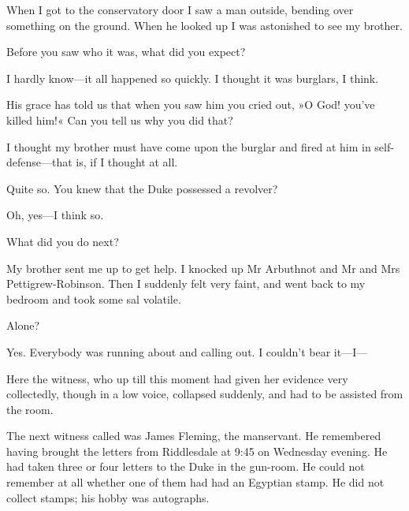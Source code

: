 \begin{dialogue}
  When I got to the conservatory door I saw a man outside, bending over something on the ground. When he looked up I was astonished to see my brother.

 Before you saw who it was, what did you expect?

 I hardly know\allowbreak---\allowbreak it all happened so quickly. I thought it was burglars, I think.

 His grace has told us that when you saw him you cried out, »O God! you've killed him!« Can you tell us why you did that?

  I thought my brother must have come upon the burglar and fired at him in self-defense\allowbreak---\allowbreak that is, if I thought at all.

 Quite so. You knew that the Duke possessed a revolver?

 Oh, yes\allowbreak---\allowbreak I think so.

 What did you do next?

 My brother sent me up to get help. I knocked up Mr Arbuthnot and Mr and Mrs Pettigrew-Robinson. Then I suddenly felt very faint, and went back to my bedroom and took some sal volatile.

 Alone?

 Yes. Everybody was running about and calling out. I couldn't bear it\allowbreak---\allowbreak I---
\end{dialogue}

Here the witness, who up till this moment had given her evidence very collectedly, though in a low voice, collapsed suddenly, and had to be assisted from the room.


The next witness called was James Fleming, the manservant. He remembered having brought the letters from Riddlesdale at 9:45 on Wednesday evening. He had taken three or four letters to the Duke in the gun-room. He could not remember at all whether one of them had had an Egyptian stamp. He did not collect stamps; his hobby was autographs.

